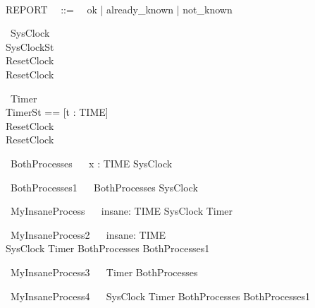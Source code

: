\documentclass{llncs}
\begin{document}
\begin{zed}
\\
REPORT ~~::=~~ ok | already\_known | not\_known\\
\end{zed}
\begin{circus}
\circprocess ~SysClock ~\circdef~ 
\circbegin\\
  \circstate SysClockSt \\
  ResetClock ~\circdef~\Skip\\
  \circspot ResetClock\\
  \circend
\end{circus}
\begin{circus}
\circprocess ~Timer ~\circdef~ 
\circbegin\\
  \circstate TimerSt == [t : TIME]\\
  ResetClock ~\circdef~\Skip\\
  \circspot ResetClock\\
  \circend
\end{circus}
\begin{circus}
\circprocess ~BothProcesses ~\circdef~ \Semi x : TIME \circspot SysClock\\
\end{circus}
\begin{circus}
\circprocess ~BothProcesses1 ~\circdef~ BothProcesses \circsemi SysClock\\
\end{circus}
\begin{circus}
\circprocess ~MyInsaneProcess ~\circdef~ \Semi insane: TIME \circspot SysClock \circsemi Timer\\
\end{circus}


\begin{circus}
\circprocess ~MyInsaneProcess2 ~\circdef~ \Semi insane: TIME \circspot \\
		SysClock \extchoice Timer \circsemi BothProcesses \intchoice BothProcesses1\\
\end{circus}
\begin{circus}

\circprocess ~MyInsaneProcess3 ~\circdef~ 
		Timer \lpar \lchanset \rchanset \rpar BothProcesses\\
\end{circus}
\begin{circus}

\circprocess ~MyInsaneProcess4 ~\circdef~ 
		SysClock \extchoice Timer \lpar \lchanset \rchanset \rpar BothProcesses \intchoice BothProcesses1\\
\end{circus}
\end{document}
